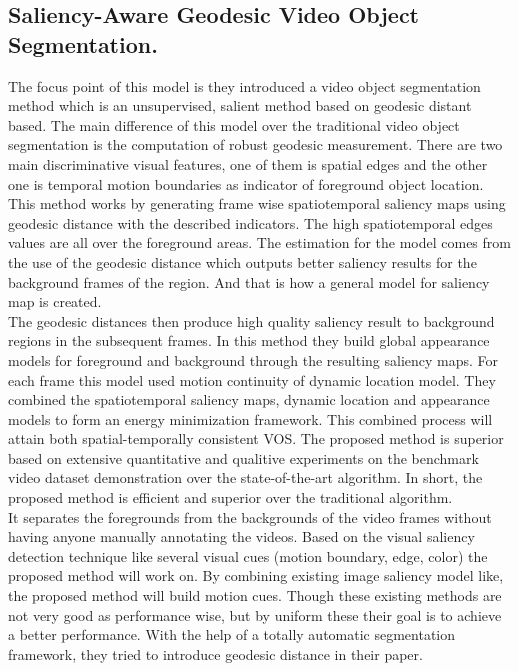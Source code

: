 \documentclass[conference]{IEEEtran}
\begin{document}
\subsection{Saliency-Aware Geodesic Video Object Segmentation.} The focus point of this model is they introduced a video object segmentation method which is an unsupervised, salient method based on geodesic distant based. The main difference of this model\cite{wang2015saliency} over the traditional video object segmentation is the computation of robust geodesic measurement. There are two main discriminative visual features, one of them is spatial edges and the other one is temporal motion boundaries as indicator of foreground object location. This method works by generating frame wise spatiotemporal saliency maps using geodesic distance with the described indicators. The high spatiotemporal edges values are all over the foreground areas. The estimation for the model comes from the use of the geodesic distance which outputs better saliency results for the background frames of the region. And that is how a general model for saliency map is created.\\ 
The geodesic distances then produce high quality saliency result to background regions in the subsequent frames. In this method they build global appearance models for foreground and background through the resulting saliency maps. For each frame this model used motion continuity of dynamic location model.  They combined the spatiotemporal saliency maps, dynamic location and appearance models to form an energy minimization framework. This combined process will attain both spatial-temporally consistent VOS. The proposed method is superior based on extensive quantitative and qualitive experiments on the benchmark video dataset demonstration over the state-of-the-art algorithm. In short, the proposed method is efficient and superior over the traditional algorithm.\\
It separates the foregrounds from the backgrounds of the video frames without having anyone manually annotating the videos. Based on the visual saliency detection technique like several visual cues (motion boundary, edge, color) the proposed method will work on. By combining existing image saliency model like,\cite{fu2013cluster, guo2008spatio, mahadevan2009spatiotemporal, mathe2012dynamic, seo2009static} the proposed method will build motion cues. Though these existing methods are not very good as performance wise, but by uniform these their goal is to achieve a better performance. With the help of a totally automatic segmentation framework, they tried to introduce geodesic distance in their paper.\\
\end{document}
